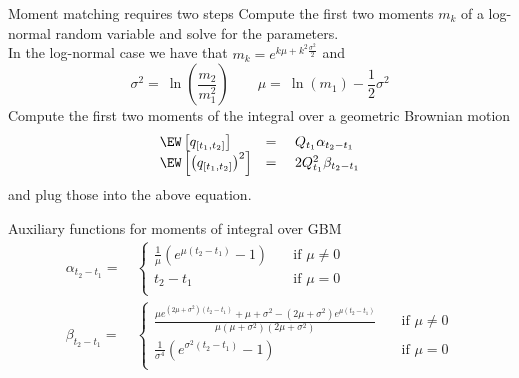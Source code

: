 Moment matching requires two steps
	Compute the first two moments $m_k$ of a log-normal random variable and solve for the parameters. \\
	In the log-normal case we have that $m_k = e^{k\mu + k^2 \frac{\sigma^2}{2}}$ and
    $$
    \sigma^2 = \ \ln\left( \frac{m_2}{m^2_1}\right)  \qquad \mu = \ \ln(m_1) - \frac{1}{2}  \sigma^2
    $$
    Compute the first two moments of the integral over a geometric Brownian motion
    $$
			\begin{array}{lll}
				\EW \left[ q_{[t_1,t_2]} \right] &=& \ Q_{t_1} \alpha_{t_2-t_1} \\
				\EW \left[ \left( q_{[t_1,t_2]} \right)^2 \right] &=& \ 2 Q_{t_1}^2 \beta_{t_2-t_1}
			\end{array}
		$$
    and plug those into the above equation.
    

Auxiliary functions for moments of integral over GBM
	\begin{align}
		\alpha_{t_2-t_1}    =& \ \left\{
         \begin{array}{ll}
            \frac{1}{\mu} \left( e^{\mu \left( t_2 - t_1 \right)} - 1 \right)
            & \quad \mbox{if $\mu \ne 0$} \\
            t_2 - t_1
            & \quad \mbox{if $\mu = 0$} \\
         \end{array} \right. \label{MomIntAlpha} \\
		\beta_{t_2-t_1}    =& \ \left\{
         \begin{array}{ll}
            \frac{ \mu e^{(2 \mu + \sigma^2) \left( t_2 - t_1 \right)} + \mu + \sigma^2 - \left( 2\mu + \sigma^2\right) e^{\mu \left( t_2 - t_1 \right)}}{\mu(\mu + \sigma^2)(2\mu + \sigma^2)}
            & \quad \mbox{if $\mu \ne 0$} \\
            \frac{1}{\sigma^4} \left( e^{\sigma^2\left(t_2-t_1\right)} - 1\right)
            & \quad \mbox{if $\mu = 0$} \\
         \end{array} \right. \label{MomIntBeta}
	\end{align}




